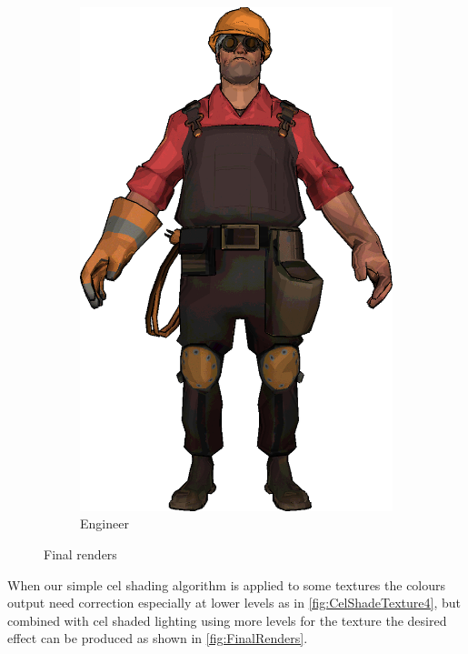 \begin{figure}[h]
\begin{subfigure}[b]{0.18\textwidth}
        \includegraphics[width=\textwidth]{img/Combined/FinalEngineer.png}
        \caption{Engineer}
 		\label{fig:FinalEngineer}
\end{subfigure}
\caption{Final renders}
 \label{fig:FinalRenders}
\end{figure} 

When our simple cel shading algorithm is applied to some textures the colours output need correction especially 
at lower levels as in \autoref{fig:CelShadeTexture4}, but combined with cel shaded lighting using more levels for the 
texture the desired effect can be produced as shown in \autoref{fig:FinalRenders}. 

